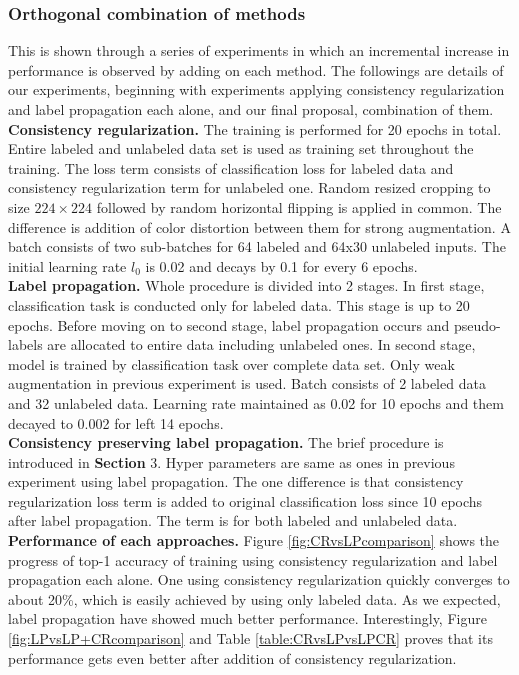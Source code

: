 \documentclass[10pt,twocolumn,letterpaper]{article}
\begin{document}
\subsubsection{Orthogonal combination of methods}
This is shown through a series of experiments in which an incremental increase in performance is observed by adding on each method. The followings are details of our experiments, beginning with experiments applying consistency regularization and label propagation each alone, and our final proposal, combination of them.\\
\textbf{Consistency regularization.} The training is performed for 20 epochs in total. Entire labeled and unlabeled data set is used as training set throughout the training.  The loss term consists of classification loss for labeled data and consistency regularization term for unlabeled one. Random resized cropping to size $224\times224$ followed by random horizontal flipping is applied in common. The difference is addition of color distortion between them for strong augmentation. A batch consists of two sub-batches for 64 labeled and 64x30 unlabeled inputs. The initial learning rate $l_0$ is 0.02 and decays by 0.1 for every 6 epochs.\\
\textbf{Label propagation.} Whole procedure is divided into 2 stages. In first stage, classification task is conducted only for labeled data. This stage is up to 20 epochs. Before moving on to second stage, label propagation occurs and pseudo-labels are allocated to entire data including unlabeled ones. In second stage, model is trained by classification task over complete data set. Only weak augmentation in previous experiment is used. Batch consists of 2 labeled data and 32 unlabeled data. Learning rate maintained as 0.02 for 10 epochs and them decayed to 0.002 for left 14 epochs.\\
\textbf{Consistency preserving label propagation.} The brief procedure is introduced in \textbf{Section} 3. Hyper parameters are same as ones in previous experiment using label propagation. The one difference is that consistency regularization loss term is added to original classification loss since 10 epochs after label propagation. The term is for both labeled and unlabeled data.\\
\textbf{Performance of each approaches.} Figure \ref{fig:CRvsLPcomparison} shows the progress of top-1 accuracy of training using consistency regularization and label propagation each alone. One using consistency regularization quickly converges to about 20\%, which is easily achieved by using only labeled data. As we expected, label propagation have showed much better performance. Interestingly, Figure \ref{fig:LPvsLP+CRcomparison} and Table \ref{table:CRvsLPvsLPCR} proves that its performance gets even better after addition of consistency regularization.
\end{document}
